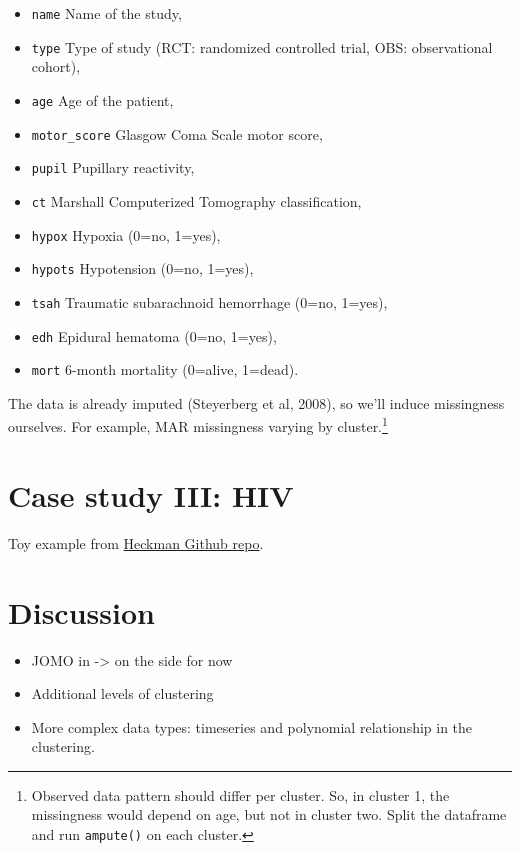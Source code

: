 \documentclass[
]{jss}
\providecommand{\tightlist}{%
  \setlength{\itemsep}{0pt}\setlength{\parskip}{0pt}}
\begin{document}
\begin{itemize}
\tightlist
\item
  \texttt{name} Name of the study,
\item
  \texttt{type} Type of study (RCT: randomized controlled trial, OBS:
  observational cohort),
\item
  \texttt{age} Age of the patient,
\item
  \texttt{motor\_score} Glasgow Coma Scale motor score,
\item
  \texttt{pupil} Pupillary reactivity,
\item
  \texttt{ct} Marshall Computerized Tomography classification,
\item
  \texttt{hypox} Hypoxia (0=no, 1=yes),
\item
  \texttt{hypots} Hypotension (0=no, 1=yes),
\item
  \texttt{tsah} Traumatic subarachnoid hemorrhage (0=no, 1=yes),
\item
  \texttt{edh} Epidural hematoma (0=no, 1=yes),
\item
  \texttt{mort} 6-month mortality (0=alive, 1=dead).
\end{itemize}

The data is already imputed (Steyerberg et al, 2008), so we'll induce
missingness ourselves. For example, MAR missingness varying by
cluster.\footnote{Observed data pattern should differ per cluster. So,
  in cluster 1, the missingness would depend on age, but not in cluster
  two. Split the dataframe and run \texttt{ampute()} on each cluster.}

\hypertarget{case-study-iii-hiv}{%
\section{Case study III: HIV}\label{case-study-iii-hiv}}

Toy example from
\href{https://github.com/johamunoz/Heckman-IPDMA/blob/main/Toy_example.R}{Heckman
Github repo}.

\hypertarget{discussion}{%
\section{Discussion}\label{discussion}}

\begin{itemize}
\item
  JOMO in  -\textgreater{} on the side for now
\item
  Additional levels of clustering
\item
  More complex data types: timeseries and polynomial relationship in the
  clustering.
\end{itemize}
\end{document}
